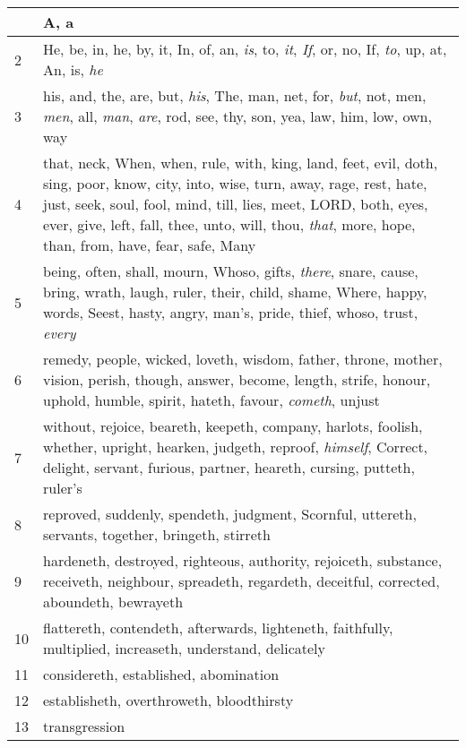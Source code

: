 \begin{center}
\begin{longtable}{l|p{3.75in}}
\hline \hline 
\endlastfoot 
1 & A, a\\ \hline 
2 & He, be, in, he, by, it, In, of, an, \emph{is}, to, \emph{it}, \emph{If}, or, no, If, \emph{to}, up, at, An, is, \emph{he}\\ \hline 
3 & his, and, the, are, but, \emph{his}, The, man, net, for, \emph{but}, not, men, \emph{men}, all, \emph{man}, \emph{are}, rod, see, thy, son, yea, law, him, low, own, way\\ \hline 
4 & that, neck, When, when, rule, with, king, land, feet, evil, doth, sing, poor, know, city, into, wise, turn, away, rage, rest, hate, just, seek, soul, fool, mind, till, lies, meet, LORD, both, eyes, ever, give, left, fall, thee, unto, will, thou, \emph{that}, more, hope, than, from, have, fear, safe, Many\\ \hline 
5 & being, often, shall, mourn, Whoso, gifts, \emph{there}, snare, cause, bring, wrath, laugh, ruler, their, child, shame, Where, happy, words, Seest, hasty, angry, man's, pride, thief, whoso, trust, \emph{every}\\ \hline 
6 & remedy, people, wicked, loveth, wisdom, father, throne, mother, vision, perish, though, answer, become, length, strife, honour, uphold, humble, spirit, hateth, favour, \emph{cometh}, unjust\\ \hline 
7 & without, rejoice, beareth, keepeth, company, harlots, foolish, whether, upright, hearken, judgeth, reproof, \emph{himself}, Correct, delight, servant, furious, partner, heareth, cursing, putteth, ruler's\\ \hline 
8 & reproved, suddenly, spendeth, judgment, Scornful, uttereth, servants, together, bringeth, stirreth\\ \hline 
9 & hardeneth, destroyed, righteous, authority, rejoiceth, substance, receiveth, neighbour, spreadeth, regardeth, deceitful, corrected, aboundeth, bewrayeth\\ \hline 
10 & flattereth, contendeth, afterwards, lighteneth, faithfully, multiplied, increaseth, understand, delicately\\ \hline 
11 & considereth, established, abomination\\ \hline 
12 & establisheth, overthroweth, bloodthirsty\\ \hline 
13 & transgression\\ \hline 
\end{longtable} 
\end{center} 




 
